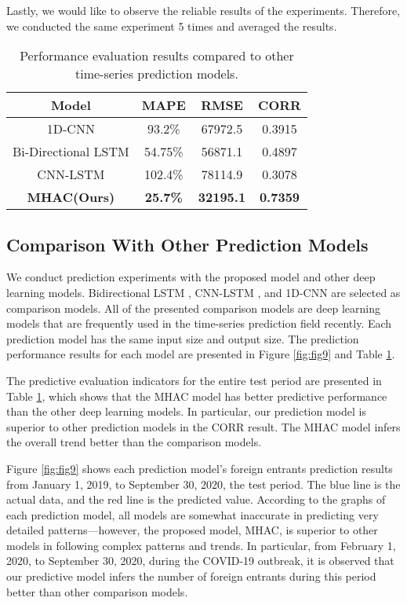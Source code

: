 \documentclass[conference]{IEEEtran}
\begin{document}
Lastly, we would like to observe the reliable results of the experiments. Therefore, we conducted the same experiment 5 times and averaged the results.

\begin{table}[t]
\centering
\caption{Performance evaluation results compared to other time-series prediction models.}
\begin{tabular}[t]{c|c|c|c}
\hline
Model&MAPE&RMSE&CORR\\
\hline
1D-CNN&93.2\%&67972.5&0.3915\\

Bi-Directional LSTM&54.75\%&56871.1&0.4897\\

CNN-LSTM&102.4\%&78114.9&0.3078\\

\textbf{MHAC(Ours)}&\textbf{25.7\%}&\textbf{32195.1}&\textbf{0.7359}\\

\end{tabular}
\label{table:tb2}
\end{table}

\subsection{Comparison With Other Prediction Models}
We conduct prediction experiments with the proposed model and other deep learning models. Bidirectional LSTM \cite{ma2018parallel}, CNN-LSTM \cite{livieris2020cnn}, and 1D-CNN \cite{barra2020deep} are selected as comparison models. All of the presented comparison models are deep learning models that are frequently used in the time-series prediction field recently. Each prediction model has the same input size and output size. The prediction performance results for each model are presented in Figure \ref{fig:fig9} and Table \ref{table:tb2}.

The predictive evaluation indicators for the entire test period are presented in Table \ref{table:tb2}, which shows that the MHAC model has better predictive performance than the other deep learning models. In particular, our prediction model is superior to other prediction models in the CORR result. The MHAC model infers the overall trend better than the comparison models.

Figure \ref{fig:fig9} shows each prediction model's foreign entrants prediction results from January 1, 2019, to September 30, 2020, the test period. The blue line is the actual data, and the red line is the predicted value. According to the graphs of each prediction model, all models are somewhat inaccurate in predicting very detailed patterns—however, the proposed model, MHAC, is superior to other models in following complex patterns and trends. In particular, from February 1, 2020, to September 30, 2020, during the COVID-19 outbreak, it is observed that our predictive model infers the number of foreign entrants during this period better than other comparison models.
\end{document}
